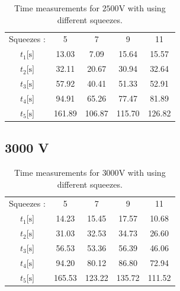 \documentclass[reprint,amsmath,aps,nofootinbib,english]{revtex4-2}
\begin{document}
\begin{table}[H]
\caption{\label{tab:kv25}%
Time measurements for $2500\si{\volt}$ with using different squeezes.
}
\begin{ruledtabular}
\begin{tabular}{ccccc}
\textrm{Squeezes :} &
\textrm{5} &
\textrm{7} &
\textrm{9} &
\textrm{11} \\ 
\colrule  
\textit{$t_1$}\hspace{1mm}[$\si{\second}]$& 13.03  & 7.09   & 15.64 & 15.57  \\
\textit{$t_2$}\hspace{1mm}[$\si{\second}]$& 32.11  & 20.67  & 30.94 & 32.64  \\
\textit{$t_3$}\hspace{1mm}[$\si{\second}]$& 57.92  & 40.41  & 51.33 & 52.91  \\
\textit{$t_4$}\hspace{1mm}[$\si{\second}]$& 94.91  & 65.26  & 77.47 & 81.89  \\
\textit{$t_5$}\hspace{1mm}[$\si{\second}]$& 161.89 & 106.87 & 115.70 & 126.82    
\end{tabular}  
\end{ruledtabular}
\end{table}


\subsection{3000 V}

\begin{table}[H]
\caption{\label{tab:kv30}%
Time measurements for $3000\si{\volt}$ with using different squeezes.
}
\begin{ruledtabular}
\begin{tabular}{ccccc}
\textrm{Squeezes :} &
\textrm{5} &
\textrm{7} &
\textrm{9} &
\textrm{11} \\ 
\colrule  
\textit{$t_1$}\hspace{1mm}[$\si{\second}]$&14.23     & 15.45      & 17.57  & 10.68  \\
\textit{$t_2$}\hspace{1mm}[$\si{\second}]$&31.03     & 32.53      & 34.73  & 26.60  \\
\textit{$t_3$}\hspace{1mm}[$\si{\second}]$&56.53     & 53.36      & 56.39  & 46.06  \\
\textit{$t_4$}\hspace{1mm}[$\si{\second}]$&94.20     & 80.12      & 86.80  & 72.94  \\
\textit{$t_5$}\hspace{1mm}[$\si{\second}]$&165.53    & 123.22     & 135.72 & 111.52 
\end{tabular}  
\end{ruledtabular}
\end{table}
\end{document}
